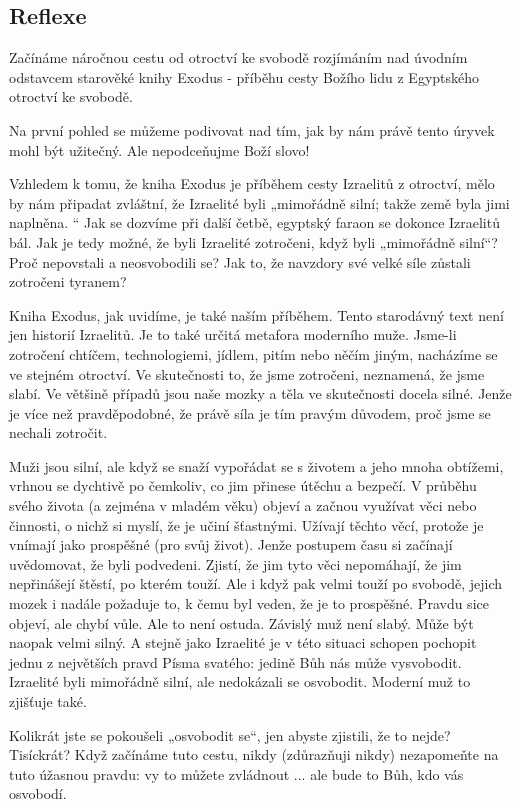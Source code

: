 \documentclass[11pt]{article}
\begin{document}
\subsection*{Reflexe}
Začínáme náročnou cestu od otroctví ke svobodě rozjímáním nad úvodním odstavcem starověké knihy Exodus - příběhu cesty Božího lidu z Egyptského otroctví ke svobodě.

Na první pohled se můžeme podivovat nad tím, jak by nám právě tento úryvek mohl být užitečný. Ale nepodceňujme Boží slovo!

Vzhledem k tomu, že kniha Exodus je příběhem cesty Izraelitů z otroctví, mělo by nám připadat zvláštní, že Izraelité byli „mimořádně silní; takže země byla jimi naplněna. “
Jak se dozvíme při další četbě, egyptský faraon se dokonce Izraelitů bál. Jak je tedy možné, že byli Izraelité zotročeni, když byli „mimořádně silní“? Proč nepovstali a neosvobodili se? Jak to, že navzdory své velké síle zůstali zotročeni tyranem?

Kniha Exodus, jak uvidíme, je také naším příběhem. Tento starodávný text není jen historií Izraelitů. Je to také určitá metafora moderního muže. Jsme-li zotročení chtíčem, technologiemi, jídlem, pitím nebo něčím jiným, nacházíme se ve stejném otroctví. Ve skutečnosti to, že jsme zotročeni, neznamená, že jsme slabí.
Ve většině případů jsou naše mozky a těla ve skutečnosti docela silné.
Jenže je více než pravděpodobné, že právě síla je tím pravým důvodem, proč jsme se nechali zotročit.

Muži jsou silní, ale když se snaží vypořádat se s životem a jeho mnoha obtížemi, vrhnou se dychtivě po čemkoliv, co jim přinese útěchu a bezpečí. V průběhu svého života (a zejména v mladém věku) objeví a začnou využívat věci nebo činnosti, o nichž si myslí, že je učiní šťastnými. Užívají těchto věcí, protože je vnímají jako prospěšné (pro svůj život).
Jenže postupem času si začínají uvědomovat, že byli podvedeni. Zjistí, že jim tyto věci nepomáhají, že jim nepřinášejí štěstí, po kterém touží. Ale i když pak velmi touží po svobodě, jejich mozek i nadále požaduje to, k čemu byl veden, že je to prospěšné. Pravdu sice objeví, ale chybí vůle.
Ale to není ostuda. Závislý muž není slabý. Může být naopak velmi silný. A stejně jako Izraelité je v této situaci schopen pochopit jednu z největších pravd Písma svatého: jedině Bůh nás může vysvobodit.
Izraelité byli mimořádně silní, ale nedokázali se osvobodit. Moderní muž to zjišťuje také.

Kolikrát jste se pokoušeli „osvobodit se“, jen abyste zjistili, že to nejde? Tisíckrát?
Když začínáme tuto cestu, nikdy (zdůrazňuji nikdy) nezapomeňte na tuto úžasnou pravdu: vy to můžete zvládnout ... ale bude to Bůh, kdo vás osvobodí.
\end{document}
